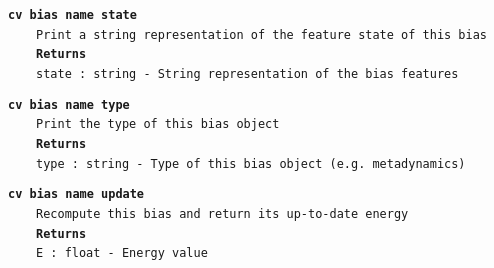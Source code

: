 \begin{mdexampleinput}{}
\texttt{\textbf{cv bias name state}}
\\
\-~~~~\texttt{Print a string representation of the feature state of this bias}
\\
\-~~~~\texttt{\textbf{Returns}}
\\
\-~~~~\texttt{state : string - String representation of the bias features}
\end{mdexampleinput}
\begin{mdexampleinput}{}
\texttt{\textbf{cv bias name type}}
\\
\-~~~~\texttt{Print the type of this bias object}
\\
\-~~~~\texttt{\textbf{Returns}}
\\
\-~~~~\texttt{type : string - Type of this bias object (e.g. metadynamics)}
\end{mdexampleinput}
\begin{mdexampleinput}{}
\texttt{\textbf{cv bias name update}}
\\
\-~~~~\texttt{Recompute this bias and return its up-to-date energy}
\\
\-~~~~\texttt{\textbf{Returns}}
\\
\-~~~~\texttt{E : float - Energy value}
\end{mdexampleinput}
